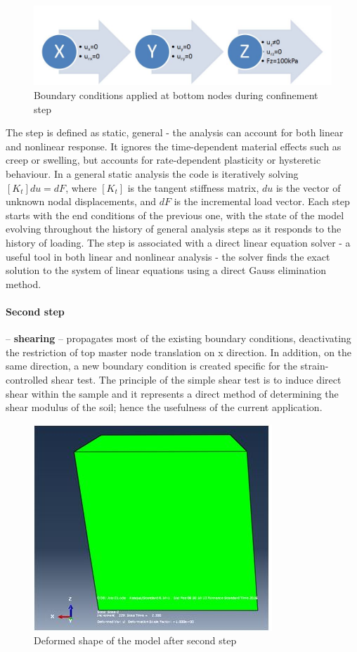 \documentclass[12pt,a4paper]{report}
\begin{document}
\begin{figure}[h!]
	\centering
	\includegraphics[width=0.6\linewidth]{"bc1d"}
	\caption{Boundary conditions applied at bottom nodes during confinement step}
	\label{bc1}
\end{figure}

The step is defined as static, general - the analysis can account for both linear and nonlinear response. It ignores the time-dependent material effects such as creep or swelling, but accounts for rate-dependent plasticity or hysteretic behaviour. In a general static analysis the code is iteratively solving $[K_t]{du}= {dF}$, where $[K_t]$ is the tangent stiffness matrix, ${du}$ is the vector of unknown nodal displacements, and ${dF}$ is the incremental load vector. Each step starts with the end conditions of the previous one, with the state of the model evolving throughout the history of general analysis steps as it responds to the history of loading. The step is associated with a direct linear equation solver - a useful tool in both linear and nonlinear analysis - the solver finds the exact solution to the system of linear equations using a direct Gauss elimination method. 
\paragraph{Second step}
 – \textbf{shearing} – propagates most of the existing boundary conditions, deactivating the restriction of top master node translation on x direction. In addition, on the same direction, a new boundary condition is created specific for the strain-controlled shear test. The principle of the simple shear test is to induce direct shear within the sample and it represents a direct method of determining the shear modulus of the soil; hence the usefulness of the current application.

\begin{figure}[h!]
	\centering
	\includegraphics[width=0.33\linewidth]{"deformed"}
	\caption{Deformed shape of the model after second step}
	\label{deformed}
\end{figure}
\end{document}
